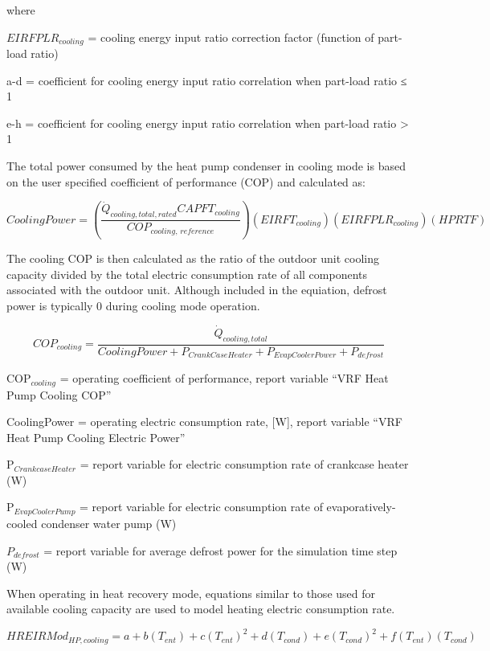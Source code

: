 where

\(EIRFPLR_{cooling}\) = cooling energy input ratio correction factor (function of part-load ratio)

a-d = coefficient for cooling energy input ratio correlation when part-load ratio ≤ 1

e-h = coefficient for cooling energy input ratio correlation when part-load ratio > 1

The total power consumed by the heat pump condenser in cooling mode is based on the user specified coefficient of performance (COP) and calculated as:

\begin{equation}
  CoolingPower = \left( \frac{\dot{Q}_{cooling,total,rated} CAPFT_{cooling}}{COP_{cooling,\,reference}} \right) \left( EIRFT_{cooling} \right) \left( EIRFPLR_{cooling} \right) \left( HPRTF \right)
\end{equation}

The cooling COP is then calculated as the ratio of the outdoor unit cooling capacity divided by the total electric consumption rate of all components associated with the outdoor unit. Although included in the equiation, defrost power is typically 0 during cooling mode operation.

\begin{equation}
  COP_{cooling} = \frac{\dot{Q}_{cooling,total}}{CoolingPower + P_{CrankCaseHeater} + P_{EvapCoolerPower} + P_{defrost}}
\end{equation}

COP\(_{cooling}\) = operating coefficient of performance, report variable ``VRF Heat Pump Cooling COP''

CoolingPower = operating electric consumption rate, [W], report variable ``VRF Heat Pump Cooling Electric Power''

P\(_{CrankcaseHeater}\) = report variable for electric consumption rate of crankcase heater (W)

P\(_{EvapCoolerPump}\) = report variable for electric consumption rate of evaporatively-cooled condenser water pump (W)

\({P_{defrost}}\) = report variable for average defrost power for the simulation time step (W)

When operating in heat recovery mode, equations similar to those used for available cooling capacity are used to model heating electric consumption rate.

\begin{equation}
  HREIRMod_{HP,cooling} = a + b \left( T_{ent} \right) + c \left( T_{ent} \right)^2 + d \left( T_{cond} \right) + e \left( T_{cond} \right)^2 + f \left( T_{ent} \right) \left( T_{cond} \right)
\end{equation}

